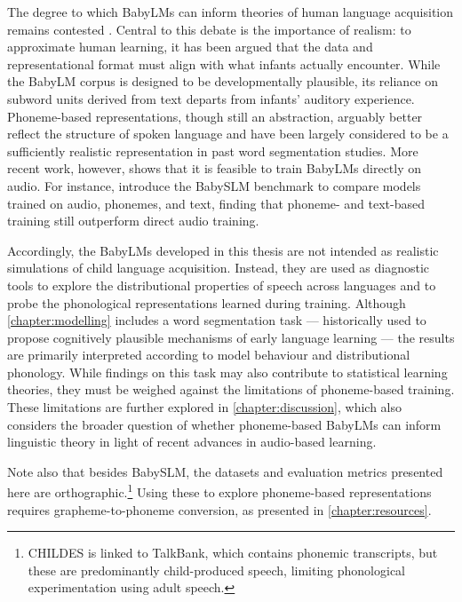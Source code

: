 The degree to which BabyLMs can inform theories of human language acquisition remains contested \citep{dupoux-2018-cognitive,baroni-2022-proper,warstadt-2022-artificial,seyssel-2023-realistic,beinborn2024cognitive,wilcox2025bigger,salhancopil2025}. Central to this debate is the importance of realism: to approximate human learning, it has been argued that the data and representational format must align with what infants actually encounter. While the BabyLM corpus is designed to be developmentally plausible, its reliance on subword units derived from text departs from infants' auditory experience. Phoneme-based representations, though still an abstraction, arguably better reflect the structure of spoken language and have been largely considered to be a sufficiently realistic representation in past word segmentation studies. More recent work, however, shows that it is feasible to train BabyLMs directly on audio. For instance, \citet{lavechin} introduce the BabySLM benchmark to compare models trained on audio, phonemes, and text, finding that phoneme- and text-based training still outperform direct audio training. %


Accordingly, the BabyLMs developed in this thesis are not intended as realistic simulations of child language acquisition. Instead, they are used as diagnostic tools to explore the distributional properties of speech across languages and to probe the phonological representations learned during training. Although \cref{chapter:modelling} includes a word segmentation task --- historically used to propose cognitively plausible mechanisms of early language learning --- the results are primarily interpreted according to model behaviour and distributional phonology. While findings on this task may also contribute to statistical learning theories, they must be weighed against the limitations of phoneme-based training. These limitations are further explored in \cref{chapter:discussion}, which also considers the broader question of whether phoneme-based BabyLMs can inform linguistic theory in light of recent advances in audio-based learning.

Note also that besides BabySLM, the datasets and evaluation metrics presented here are orthographic.\footnote{CHILDES is linked to TalkBank, which contains phonemic transcripts, but these are predominantly child-produced speech, limiting phonological experimentation using adult speech.} Using these to explore phoneme-based representations requires grapheme-to-phoneme conversion, as presented in \cref{chapter:resources}. 

